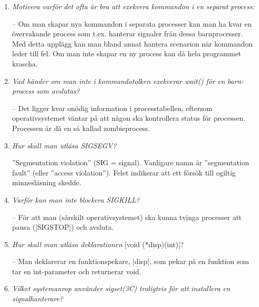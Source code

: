 \documentclass[paper=a4, fontsize=11pt]{scrartcl} %
\numberwithin{equation}{section} %
\numberwithin{figure}{section} %
\numberwithin{table}{section} %
\begin{document}
\begin{enumerate}[1)]

\item 
\emph{Motivera varför det ofta är bra att exekvera kommandon i en separat process:}

-- Om man skapar nya kommandon i separata processer kan man ha kvar en 
övervakande process som t.ex. hanterar signaler från dessa barnprocesser. 
Med detta upplägg kan man bland annat hantera scenarion när kommandon 
leder till fel. Om man inte skapar en ny process kan då hela programmet krascha.

\item
\emph{Vad händer om man inte i kommandotolken exekverar wait() för en 
barn-process som avslutas?}

-- Det ligger kvar onödig information i processtabellen, 
eftersom operativsystemet väntar på att någon ska kontrollera status för processen. 
Processen är då en så kallad zombieprocess.

\item
\emph{Hur skall man utläsa SIGSEGV?}

''Segmentation violation'' (SIG = signal). 
Vanligare namn är ''segmentation fault'' (eller ''access violation'').
Felet indikerar att ett försök till ogiltig minnesläsning skedde.

\item
\emph{Varför kan man inte blockera SIGKILL?} %

-- För att man (särskilt operativsystemet) ska kunna tvinga processer att pausa (|SIGSTOP|) och avsluta.



\item
\emph{Hur skall man utläsa deklarationen} |void (*disp)(int)|?

-- Man deklarerar en funktionspekare, |disp|, som pekar på en funktion som 
tar en int-parameter och returnerar void.

\item
\emph{Vilket systemanrop använder sigset(3C) troligtvis för att 
installera en signalhanterare?} %


\end{enumerate}
\end{document}
